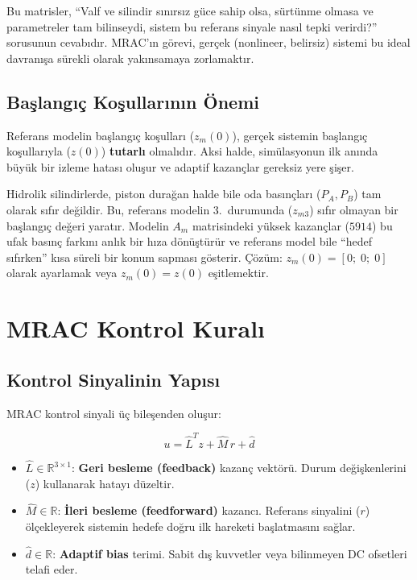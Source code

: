 \documentclass[12pt,a4paper]{article}
\begin{document}
\begin{kavram}
Bu matrisler, ``Valf ve silindir sınırsız güce sahip olsa, sürtünme olmasa ve parametreler tam bilinseydi, sistem bu referans sinyale nasıl tepki verirdi?'' sorusunun cevabıdır. MRAC'ın görevi, gerçek (nonlineer, belirsiz) sistemi bu ideal davranışa sürekli olarak yakınsamaya zorlamaktır.
\end{kavram}

\subsection{Başlangıç Koşullarının Önemi}

Referans modelin başlangıç koşulları ($z_m(0)$), gerçek sistemin başlangıç koşullarıyla ($z(0)$) \textbf{tutarlı} olmalıdır. Aksi halde, simülasyonun ilk anında büyük bir izleme hatası oluşur ve adaptif kazançlar gereksiz yere şişer.

\begin{dikkat}
Hidrolik silindirlerde, piston durağan halde bile oda basınçları ($P_A, P_B$) tam olarak sıfır değildir. Bu, referans modelin 3.~durumunda ($z_{m3}$) sıfır olmayan bir başlangıç değeri yaratır. Modelin $A_m$ matrisindeki yüksek kazançlar ($5914$) bu ufak basınç farkını anlık bir hıza dönüştürür ve referans model bile ``hedef sıfırken'' kısa süreli bir konum sapması gösterir. Çözüm: $z_m(0) = [0;\; 0;\; 0]$ olarak ayarlamak veya $z_m(0) = z(0)$ eşitlemektir.
\end{dikkat}

\section{MRAC Kontrol Kuralı}
\label{sec:mrac}

\subsection{Kontrol Sinyalinin Yapısı}

MRAC kontrol sinyali üç bileşenden oluşur:

\begin{equation}
    \boxed{u = \hat{L}^T z + \hat{M}\,r + \hat{d}}
    \label{eq:control_law}
\end{equation}

\begin{itemize}
    \item $\hat{L} \in \mathbb{R}^{3\times1}$: \textbf{Geri besleme (feedback)} kazanç vektörü. Durum değişkenlerini ($z$) kullanarak hatayı düzeltir.
    \item $\hat{M} \in \mathbb{R}$: \textbf{İleri besleme (feedforward)} kazancı. Referans sinyalini ($r$) ölçekleyerek sistemin hedefe doğru ilk hareketi başlatmasını sağlar.
    \item $\hat{d} \in \mathbb{R}$: \textbf{Adaptif bias} terimi. Sabit dış kuvvetler veya bilinmeyen DC ofsetleri telafi eder.
\end{itemize}
\end{document}
